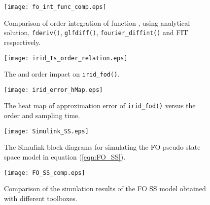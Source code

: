 \documentclass[11pt]{tCON2e}
\theoremstyle{plain}\newtheorem{theorem}{Theorem}
\theoremstyle{definition}
\theoremstyle{remark}
\begin{document}
\begin{figure}[h]
\centering
\texttt{[image: fo\_int\_func\_comp.eps]}
\caption[Comparison of  order integral of function ]{Comparison of  order integration of function , using analytical solution, {\tt fderiv()}, {\tt glfdiff()}, {\tt fourier\_diffint()} and FIT respectively.}
\label{fig:fo_int_func_comp}
\end{figure}

\begin{figure}[h]
\centering
\texttt{[image: irid\_Ts\_order\_relation.eps]}
\caption{The  and order impact on {\tt irid\_fod()}.}
\label{fig:irid_Ts_order_relation}
\end{figure}

\begin{figure}[h]
\centering
\texttt{[image: irid\_error\_hMap.eps]}
\caption[Error heat map of {\tt irid\_fod()}]{The heat map of approximation error of {\tt irid\_fod()} versus the order and sampling time.}
\label{fig:irid_error_hMap}
\end{figure}


\begin{figure}[h]
\centering
\texttt{[image: Simulink\_SS.eps]}
\caption{The Simulink block diagrams for simulating the FO pseudo state space model in equation (\ref{eqn:FO_SS}).}
\label{fig:Simulink_SS}
\end{figure}

\begin{figure}[h]
\centering
\texttt{[image: FO\_SS\_comp.eps]}
\caption{Comparison of the simulation results of the FO SS model obtained with different toolboxes.}
\label{fig:FO_SS_comp}
\end{figure}






\clearpage
\end{document}
